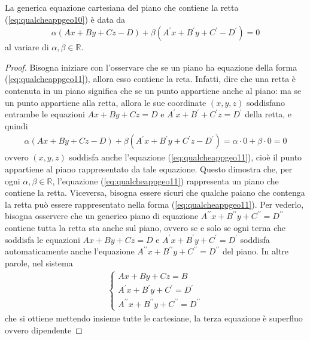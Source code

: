 \begin{prop}
  \label{prop:qualcheappgeo4}
  La generica equazione cartesiana del piano che contiene la retta (\ref{eq:qualcheappgeo10}) è data
  da
  \begin{equation}
    \label{eq:qualcheappgeo11}
    \alpha (Ax+By+Cz-D)+\beta (A^\prime x +B^\prime y + C^\prime-D^\prime)=0
  \end{equation}
  al variare di $\alpha,\beta\in \mathds{R}$.
\end{prop}
\begin{proof}
  Bisogna iniziare con l'osservare che se un piano ha equazione della forma (\ref{eq:qualcheappgeo11}),
  allora esso contiene la reta. Infatti, dire che una retta è contenuta in un piano significa che se
  un punto appartiene anche al piano: ma se un punto appartiene alla retta, allora le sue coordinate
  $(x,y,z)$ soddisfano entrambe le equazioni $Ax+By+Cz=D$ e $A^\prime x+B^\prime+C^\prime z=D^\prime$ della
  retta, e quindi
  \begin{eqnarray*}
    \alpha(Ax+By+Cz-D)+\beta(A^\prime x+B^\prime y+C^\prime z-D^\prime) = \alpha \cdot 0+\beta \cdot 0=0
  \end{eqnarray*}
  ovvero $(x,y,z)$ soddisfa anche l'equazione (\ref{eq:qualcheappgeo11}), cioè il punto appartiene al
  piano rappresentato da tale equazione. Questo dimostra che, per ogni $\alpha, \beta\in \mathds{R}$,
  l'equazione (\ref{eq:qualcheappgeo11}) rappresenta un piano che contiene la retta.
  Viceversa, bisogna essere sicuri che qualche paiano che contenga la retta può essere rappresentato
  nella forma (\ref{eq:qualcheappgeo11}). Per vederlo, bisogna osservere che un generico piano di
  equazione $A^{\prime\prime}x+B^{\prime\prime}y+C^{\prime\prime}=D^{\prime\prime}$ contiene tutta la
  retta sta anche sul piano, ovvero se e solo se ogni terna che soddisfa le equazioni
  $Ax+By+Cz=D$ e $A^{\prime}x+B^{\prime}y+C^{\prime}=D^{\prime}$ soddisfa automaticamente anche
  l'equazione $A^{\prime\prime}x+B^{\prime\prime}y+C^{\prime\prime}=D^{\prime\prime}$ del piano.
  In altre parole, nel sistema
  \begin{eqnarray*}
    \begin{cases}
      Ax+By+Cz=B\\
      A^{\prime}x+B^{\prime}y+C^{\prime}=D^{\prime}\\
      A^{\prime\prime}x+B^{\prime\prime}y+C^{\prime\prime}=D^{\prime\prime}
    \end{cases}
  \end{eqnarray*}
  che si ottiene mettendo insieme tutte le cartesiane, la terza equazione è superfluo ovvero dipendente

\end{proof}
